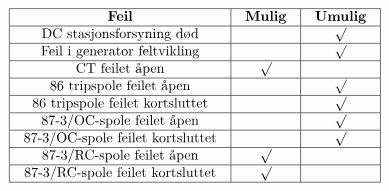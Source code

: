 $$\vbox{\offinterlineskip
\halign{\strut
\vrule \quad\hfil # \ \hfil & 
\vrule \quad\hfil # \ \hfil & 
\vrule \quad\hfil # \ \hfil \vrule \cr
\noalign{\hrule}
%
{\bf Feil} & {\bf Mulig} & {\bf Umulig} \cr
%
\noalign{\hrule}
%
DC stasjonsforsyning død &  & $\surd$ \cr
%
\noalign{\hrule}
%
Feil i generator feltvikling &  & $\surd$ \cr
%
\noalign{\hrule}
%
CT feilet åpen & $\surd$ &  \cr
%
\noalign{\hrule}
%
86 tripspole feilet åpen &  & $\surd$ \cr
%
\noalign{\hrule}
%
86 tripspole feilet kortsluttet &  & $\surd$ \cr
%
\noalign{\hrule}
%
87-3/OC-spole feilet åpen &  & $\surd$ \cr
%
\noalign{\hrule}
%
87-3/OC-spole feilet kortsluttet &  & $\surd$ \cr
%
\noalign{\hrule}
%
87-3/RC-spole feilet åpen & $\surd$ &  \cr
%
\noalign{\hrule}
%
87-3/RC-spole feilet kortsluttet & $\surd$ &  \cr
%
\noalign{\hrule}
} %
}$$ %




